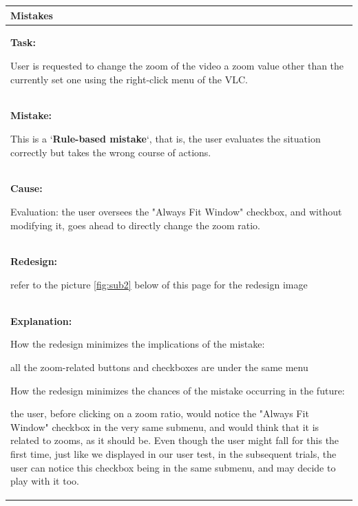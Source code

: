\documentclass[a4paper,11pt,oneside]{scrreprt}
\begin{document}
\begin{tabularx}{\textwidth}{|X|}
	\hline
		\textbf{Mistakes}
		\\
	\hline
		\textbf{Task:}
		
		User is requested to change the zoom of the video a zoom value other than the currently set one using the right-click menu of the VLC.
		\\
	\hline
		\textbf{Mistake:}
		
		This is a `\textbf{Rule-based mistake}`, that is, the user evaluates the situation correctly but takes the wrong course of actions.
		
		\\
		
		\textbf{Cause:}
		
		Evaluation: the user oversees the "Always Fit Window" checkbox, and without modifying it, goes ahead to directly change the zoom ratio.
		\\
	\hline
		\textbf{Redesign:}
		
		refer to the picture \ref{fig:sub2} below of this page for the redesign image
		\\
		
		\bigskip
		
		\textbf{Explanation:}
		
			\begin{compactenum}[	a)]
				\item How the redesign minimizes the implications of the mistake:
				
					all the zoom-related buttons and checkboxes are under the same menu
					
					\bigskip				
					
				\item How the redesign minimizes the chances of the mistake occurring in the future:
				
					the user, before clicking on a zoom ratio, would notice the "Always Fit Window" checkbox in the very same submenu, and would think that it is related to zooms, as it should be. Even though the user might fall for this the first time, just like we displayed in our user test, in the subsequent trials, the user can notice this checkbox being in the same submenu, and may decide to play with it too.
			\end{compactenum}
	\\
	\hline
	
	
	
	
	
\end{tabularx}\\
\end{document}
